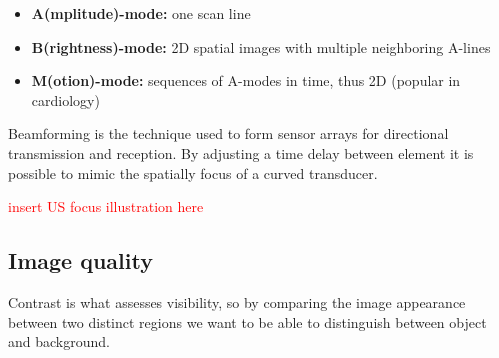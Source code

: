 		\begin{itemize}
			\item \textbf{A(mplitude)-mode:} one scan line
			\item \textbf{B(rightness)-mode:} 2D spatial images with multiple neighboring A-lines
			\item \textbf{M(otion)-mode:} sequences of A-modes in time, thus 2D (popular in cardiology) 
		\end{itemize}

	Beamforming is the technique used to form sensor arrays for directional transmission and reception. By adjusting a time delay between element it is possible to mimic the spatially focus of a curved transducer. 

	\textcolor{red}{insert US focus illustration here} 


	\subsection*{Image quality}
	Contrast is what assesses visibility, so by comparing the image appearance between two distinct regions we want to be able to distinguish between object and background. 


















	


